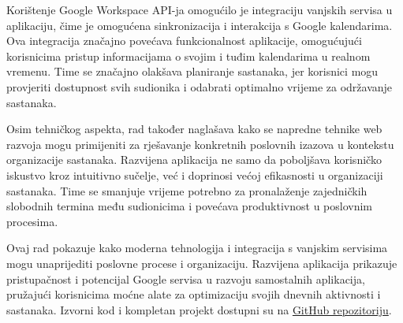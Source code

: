\documentclass{foi}
\begin{document}
Korištenje Google Workspace API-ja omogućilo je integraciju vanjskih servisa u aplikaciju, čime je omogućena sinkronizacija i interakcija s Google kalendarima. Ova integracija značajno povećava funkcionalnost aplikacije, omogućujući korisnicima pristup informacijama o svojim i tuđim kalendarima u realnom vremenu. Time se značajno olakšava planiranje sastanaka, jer korisnici mogu provjeriti dostupnost svih sudionika i odabrati optimalno vrijeme za održavanje sastanaka.

Osim tehničkog aspekta, rad također naglašava kako se napredne tehnike web razvoja mogu primijeniti za rješavanje konkretnih poslovnih izazova u kontekstu organizacije sastanaka. Razvijena aplikacija ne samo da poboljšava korisničko iskustvo kroz intuitivno sučelje, već i doprinosi većoj efikasnosti u organizaciji sastanaka. Time se smanjuje vrijeme potrebno za pronalaženje zajedničkih slobodnih termina među sudionicima i povećava produktivnost u poslovnim procesima.

Ovaj rad pokazuje kako moderna tehnologija i integracija s vanjskim servisima mogu unaprijediti poslovne procese i organizaciju. Razvijena aplikacija prikazuje pristupačnost i potencijal Google servisa u razvoju samostalnih aplikacija, pružajući korisnicima moćne alate za optimizaciju svojih dnevnih aktivnosti i sastanaka. Izvorni kod i kompletan projekt dostupni su na \href{https://github.com/LeoCavar/MeetingPlanner}{GitHub repozitoriju}.

\printbibliography[title=Popis literature]

\listoffigures
{}
\end{document}
